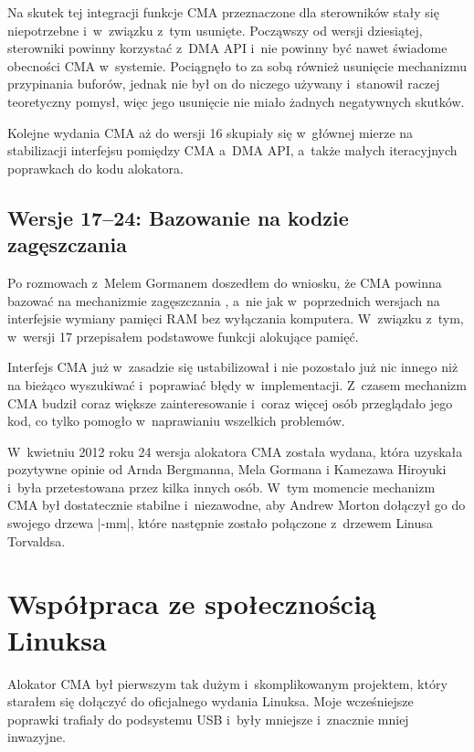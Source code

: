 Na skutek tej integracji funkcje CMA przeznaczone dla sterowników
stały się niepotrzebne i~w~związku z~tym usunięte.  Począwszy od
wersji dziesiątej, sterowniki powinny korzystać z~DMA API i~nie
powinny być nawet świadome obecności CMA w~systemie.  Pociągnęło to za
sobą również usunięcie mechanizmu przypinania buforów, jednak nie był
on do niczego używany i~stanowił raczej teoretyczny pomysł, więc jego
usunięcie nie miało żadnych negatywnych skutków.

Kolejne wydania CMA aż do wersji 16 skupiały się w~głównej mierze na
stabilizacji interfejsu pomiędzy CMA a~DMA API, a~także małych
iteracyjnych poprawkach do kodu alokatora.

\subsection{Wersje 17--24: Bazowanie na kodzie zagęszczania}

Po rozmowach z~Melem Gormanem doszedłem do wniosku, że CMA powinna
bazować na mechanizmie zagęszczania \autocite{bib:compaction,
  bib:supporting-large-contig-regions}, a~nie jak w~poprzednich
wersjach na interfejsie wymiany pamięci RAM bez wyłączania komputera.
W~związku z~tym, w~wersji 17 przepisałem podstawowe funkcji alokujące
pamięć.

Interfejs CMA już w~zasadzie się ustabilizował i nie pozostało już nic
innego niż na bieżąco wyszukiwać i~poprawiać błędy w~implementacji.
Z~czasem mechanizm CMA budził coraz większe zainteresowanie i~coraz
więcej osób przeglądało jego kod, co tylko pomogło w~naprawianiu
wszelkich problemów.

W~kwietniu 2012 roku 24 wersja alokatora CMA została wydana, która
uzyskała pozytywne opinie od Arnda Bergmanna, Mela Gormana i Kamezawa
Hiroyuki i~była przetestowana przez kilka innych osób.  W~tym momencie
mechanizm CMA był dostatecznie stabilne i~niezawodne, aby Andrew
Morton dołączył go do swojego drzewa \code|-mm|, które następnie
zostało połączone z~drzewem Linusa Torvaldsa.

\section{Współpraca ze społecznością Linuksa}

Alokator CMA był pierwszym tak dużym i~skomplikowanym projektem, który
starałem się dołączyć do oficjalnego wydania Linuksa.  Moje
wcześniejsze poprawki trafiały do podsystemu USB i~były mniejsze
i~znacznie mniej inwazyjne.

